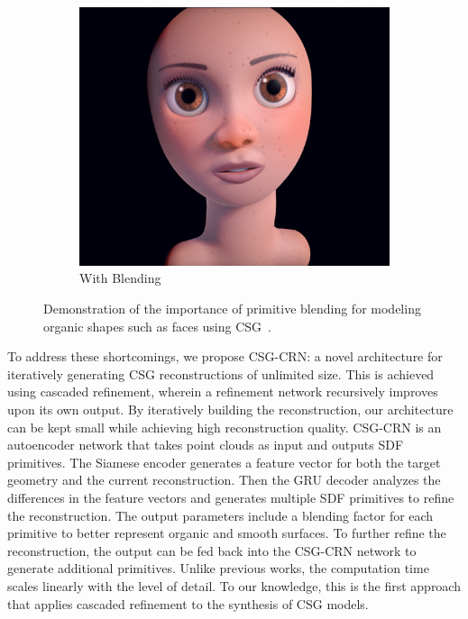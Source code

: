 \begin{figure}[!b]
\begin{subfigure}[t]{0.45\textwidth}
		\includegraphics[width=\textwidth]{Images/Face with blending}
		\caption{With Blending}
	\end{subfigure}
	\caption{Demonstration of the importance of primitive blending for modeling organic shapes such as faces using CSG~\cite{Quilez2013}.}
	\label{fig:primitive_blending}
\end{figure}

\newpage

To address these shortcomings, we propose CSG-CRN: a novel architecture for iteratively generating CSG reconstructions of unlimited size. This is achieved using cascaded refinement, wherein a refinement network recursively improves upon its own output. By iteratively building the reconstruction, our architecture can be kept small while achieving high reconstruction quality. CSG-CRN is an autoencoder network that takes point clouds as input and outputs SDF primitives. The Siamese encoder generates a feature vector for both the target geometry and the current reconstruction. Then the GRU decoder analyzes the differences in the feature vectors and generates multiple SDF primitives to refine the reconstruction. The output parameters include a blending factor for each primitive to better represent organic and smooth surfaces. To further refine the reconstruction, the output can be fed back into the CSG-CRN network to generate additional primitives. Unlike previous works, the computation time scales linearly with the level of detail. To our knowledge, this is the first approach that applies cascaded refinement to the synthesis of CSG models.

